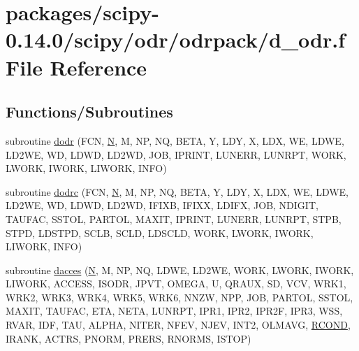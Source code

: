 \hypertarget{d__odr_8f}{}\section{packages/scipy-\/0.14.0/scipy/odr/odrpack/d\+\_\+odr.f File Reference}
\label{d__odr_8f}
\subsection*{Functions/\+Subroutines}
\begin{DoxyCompactItemize}
\item 
subroutine \hyperlink{d__odr_8f_a2f24bcde206766c7ecf04113cb7f99e3}{dodr} (F\+C\+N, \hyperlink{polmisc_8c_a0240ac851181b84ac374872dc5434ee4}{N}, M, N\+P, N\+Q, B\+E\+T\+A, Y, L\+D\+Y, X, L\+D\+X, W\+E, L\+D\+W\+E, L\+D2\+W\+E, W\+D, L\+D\+W\+D, L\+D2\+W\+D, J\+O\+B, I\+P\+R\+I\+N\+T, L\+U\+N\+E\+R\+R, L\+U\+N\+R\+P\+T, W\+O\+R\+K, L\+W\+O\+R\+K, I\+W\+O\+R\+K, L\+I\+W\+O\+R\+K, I\+N\+F\+O)
\item 
subroutine \hyperlink{d__odr_8f_a08b113dbac5d7a37c2bc27ed45a87503}{dodrc} (F\+C\+N, \hyperlink{polmisc_8c_a0240ac851181b84ac374872dc5434ee4}{N}, M, N\+P, N\+Q, B\+E\+T\+A, Y, L\+D\+Y, X, L\+D\+X, W\+E, L\+D\+W\+E, L\+D2\+W\+E, W\+D, L\+D\+W\+D, L\+D2\+W\+D, I\+F\+I\+X\+B, I\+F\+I\+X\+X, L\+D\+I\+F\+X, J\+O\+B, N\+D\+I\+G\+I\+T, T\+A\+U\+F\+A\+C, S\+S\+T\+O\+L, P\+A\+R\+T\+O\+L, M\+A\+X\+I\+T, I\+P\+R\+I\+N\+T, L\+U\+N\+E\+R\+R, L\+U\+N\+R\+P\+T, S\+T\+P\+B, S\+T\+P\+D, L\+D\+S\+T\+P\+D, S\+C\+L\+B, S\+C\+L\+D, L\+D\+S\+C\+L\+D, W\+O\+R\+K, L\+W\+O\+R\+K, I\+W\+O\+R\+K, L\+I\+W\+O\+R\+K, I\+N\+F\+O)
\item 
subroutine \hyperlink{d__odr_8f_a9af23e7866b0bc36436747a3d4580edb}{dacces} (\hyperlink{polmisc_8c_a0240ac851181b84ac374872dc5434ee4}{N}, M, N\+P, N\+Q, L\+D\+W\+E, L\+D2\+W\+E, W\+O\+R\+K, L\+W\+O\+R\+K, I\+W\+O\+R\+K, L\+I\+W\+O\+R\+K, A\+C\+C\+E\+S\+S, I\+S\+O\+D\+R, J\+P\+V\+T, O\+M\+E\+G\+A, U, Q\+R\+A\+U\+X, S\+D, V\+C\+V, W\+R\+K1, W\+R\+K2, W\+R\+K3, W\+R\+K4, W\+R\+K5, W\+R\+K6, N\+N\+Z\+W, N\+P\+P, J\+O\+B, P\+A\+R\+T\+O\+L, S\+S\+T\+O\+L, M\+A\+X\+I\+T, T\+A\+U\+F\+A\+C, E\+T\+A, N\+E\+T\+A, L\+U\+N\+R\+P\+T, I\+P\+R1, I\+P\+R2, I\+P\+R2\+F, I\+P\+R3, W\+S\+S, R\+V\+A\+R, I\+D\+F, T\+A\+U, A\+L\+P\+H\+A, N\+I\+T\+E\+R, N\+F\+E\+V, N\+J\+E\+V, I\+N\+T2, O\+L\+M\+A\+V\+G, \hyperlink{superlu__enum__consts_8h_af00a42ecad444bbda75cde1b64bd7e72a9b5c151728d8512307565994c89919d5}{R\+C\+O\+N\+D}, I\+R\+A\+N\+K, A\+C\+T\+R\+S, P\+N\+O\+R\+M, P\+R\+E\+R\+S, R\+N\+O\+R\+M\+S, I\+S\+T\+O\+P)

\end{DoxyCompactItemize}
